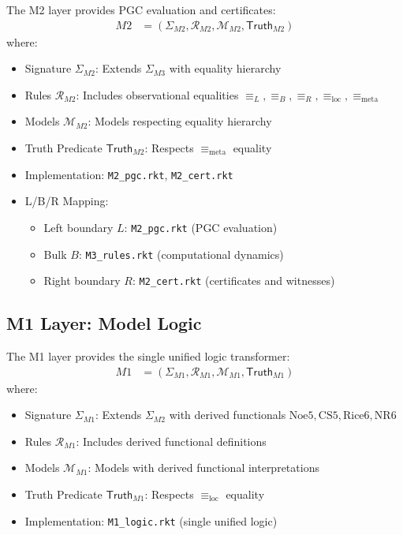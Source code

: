 \begin{definition}
\label{def:m2-complete}
The M2 layer provides PGC evaluation and certificates:
\begin{align}
M2 &= (\Sigma_{M2}, \mathcal{R}_{M2}, \mathcal{M}_{M2}, \mathsf{Truth}_{M2})
\end{align}
where:
\begin{itemize}
\item Signature $\Sigma_{M2}$: Extends $\Sigma_{M3}$ with equality hierarchy
\item Rules $\mathcal{R}_{M2}$: Includes observational equalities $\equiv_L, \equiv_B, \equiv_R, \equiv_{\text{loc}}, \equiv_{\text{meta}}$
\item Models $\mathcal{M}_{M2}$: Models respecting equality hierarchy
\item Truth Predicate $\mathsf{Truth}_{M2}$: Respects $\equiv_{\text{meta}}$ equality
\item Implementation: \texttt{M2\_pgc.rkt}, \texttt{M2\_cert.rkt}
\item L/B/R Mapping:
  \begin{itemize}
  \item Left boundary $L$: \texttt{M2\_pgc.rkt} (PGC evaluation)
  \item Bulk $B$: \texttt{M3\_rules.rkt} (computational dynamics)
  \item Right boundary $R$: \texttt{M2\_cert.rkt} (certificates and witnesses)
  \end{itemize}
\end{itemize}
\end{definition}

\subsection{M1 Layer: Model Logic}

\begin{definition}
\label{def:m1-complete}
The M1 layer provides the single unified logic transformer:
\begin{align}
M1 &= (\Sigma_{M1}, \mathcal{R}_{M1}, \mathcal{M}_{M1}, \mathsf{Truth}_{M1})
\end{align}
where:
\begin{itemize}
\item Signature $\Sigma_{M1}$: Extends $\Sigma_{M2}$ with derived functionals $\text{Noe5}, \text{CS5}, \text{Rice6}, \text{NR6}$
\item Rules $\mathcal{R}_{M1}$: Includes derived functional definitions
\item Models $\mathcal{M}_{M1}$: Models with derived functional interpretations
\item Truth Predicate $\mathsf{Truth}_{M1}$: Respects $\equiv_{\text{loc}}$ equality
\item Implementation: \texttt{M1\_logic.rkt} (single unified logic)
\end{itemize}
\end{definition}

